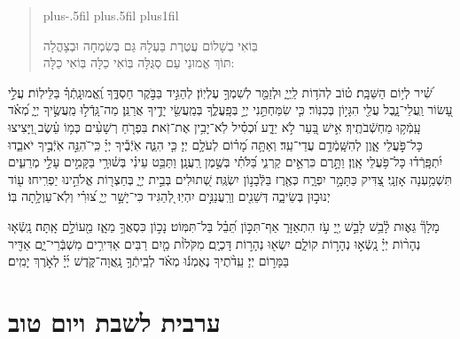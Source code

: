 \documentclass[twoside, openany, parskip=half, 11pt]{book}
\begin{document}
\begin{quote}
		\leftskip=0pt plus-.5fil
		\rightskip=0pt plus.5fil
		\parfillskip=0pt plus1fil

 בּֽוֹאִי בְשָׁלוֹם עֲטֶרֶת בַּעְלָהּ \hfill
גַּם בְּשִׂמְחָה וּבְצָהֳלָה \\
תּוֹךְ אֱמוּנֵי עַם סְגֻּלָּה \hfill
בּֽוֹאִי כַלָּה בּֽוֹאִי כַלָּה:

\lechadodi

\end{quote}

 
 
שִׁ֝֗יר לְי֥וֹם הַשַּׁבָּֽת׃
ט֗וֹב לְהֹד֥וֹת לַֽיְיָ֑ וּלְזַמֵּ֖ר לְשִׁמְךָ֣ עֶלְיֽוֹן׃ 
לְהַגִּ֣יד בַּבֹּ֣קֶר חַסְדֶּ֑ךָ וֶֽ֝אֱמוּנָֽתְֿךָ֗ בַּלֵּילֽוֹת׃ 
עֲלֵ֣י עָ֭שׂוֹר וַֽעֲלֵי־נָ֑בֶל עֲלֵ֖י הִגָּי֣וֹן בְּכִנּֽוֹר׃ 
כִּ֤י שִׂמַּחְתַּ֣נִי יְיָ֣ בְּפָֽעֳלֶ֑ךָ בְּמַֽעֲשֵׂ֖י יָדֶ֣יךָ אֲרַנֵּֽן׃ 
מַה־גָּֽדְֿל֣וּ מַֽעֲשֶׂ֣יךָ יְיָ֑ מְ֝אֹ֗ד עָֽמְֿק֥וּ מַחְשְֿׁבֹתֶֽיךָ׃ 
אִ֣ישׁ בַּ֭עַר לֹ֣א יֵדָ֑ע וּ֝כְסִ֗יל לֹֽא־יָבִ֥ין אֶת־זֹֽאת׃ 
בִּפְרֹ֤חַ רְשָׁעִ֨ים כְּמ֥וֹ עֵ֗שֶׂב וַ֭יָּצִיצוּ כָּל־פֹּ֣עֲלֵי אָ֑וֶן לְהִשָּֽׁמְֿדָ֥ם עֲדֵי־עַֽד׃ 
וְאַתָּ֥ה מָ֝ר֗וֹם לְעֹלָ֥ם יְיָ׃ 
כִּ֤י הִנֵּ֢ה אֹֽיְֿבֶ֡יךָ יְיָ֗ כִּֽי־ֹהִנֵּ֣ה אֹֽיְֿבֶ֣יךָ יֹאבֵ֑דוּ יִ֝תְפָּֽרְֿד֗וּ כָּל־פֹּ֥עֲלֵי אָֽוֶן׃ 
וַתָּ֣רֶם כִּרְאֵ֣ים קַרְנִ֑י בַּ֝לֹּתִ֗י בְּשֶׁ֣מֶן רַֽעֲנָֽן׃ 
וַתַּבֵּ֥ט עֵינִ֗י בְּשׁ֫וּרָ֥י בַּקָּמִ֣ים עָלַ֣י מְרֵעִ֑ים תִּשְׁמַ֥עְנָה אָזְנָֽי׃ 
 צַ֭דִּיק כַּתָּמָ֣ר יִפְרָ֑ח כְּאֶ֖רֶז בַּלְּֿבָנ֣וֹן יִשְׂגֶּֽה׃ 
שְׁ֭תוּלִים בְּבֵ֣ית יְיָ֑ בְּחַצְר֖וֹת אֱלֹהֵ֣ינוּ יַפְרִֽיחוּ׃ 
ע֖וֹד יְנוּב֣וּן בְּשֵׂיבָ֑ה דְּשֵׁנִ֖ים וְרַֽעֲנַנִּ֣ים יִהְיֽוּ׃ 
לְ֭הַגִּיד כִּי־יָשָׁ֣ר יְיָ֑ צ֝וּרִ֗י וְלֹֽא־עַוְלָ֥תָה בּֽוֹ׃

\clearpage
  
 מָלָךְ֘ גֵּא֢וּת לָ֫בֵ֥שׁ לָבֵ֣שׁ יְ֖יָ עֹ֣ז הִתְאַזָּר֑ אַף־תִּכּ֣וֹן תֵּ֝בֵ֗ל בַּל־תִּמּֽוֹט׃
נָכ֣וֹן כִּסְאֲךָ֣ מֵאָ֑ז מֵ֖עוֹלָ֣ם אָֽתָּה׃ 
נָֽשְֿׂא֤וּ נְהָר֨וֹת יְיָ֗ נָֽשְֿׂא֣וּ נְהָר֣וֹת קוֹלָ֑ם יִשְׂא֖וּ נְהָר֣וֹת דָּכְיָֽם׃
  מִקֹּלוֹ֨ת מַ֤יִם רַבִּים אַדִּירִ֥ים מִשְׁבְּֿרֵי־יָ֑ם אַדִּ֖יר בַּמָּר֣וֹם יְיָ׃ 
עֵֽדֹ֨תֶיךָ נֶאֶמְנ֬וּ מְאֹ֗ד לְבֵֽיתְֿךָ֥ נָֽאֲוָה־קֹּ֑דֶשׁ יְ֜יָ֗ לְאֹ֣רֶךְ יָמִֽים׃

\mournerskaddish

\section[ערבית לשבת ויום טוב]{ ערבית לשבת ויום טוב }

\barachu

\hamaarivaravim

\ahavasolam

\shema 
\end{document}
